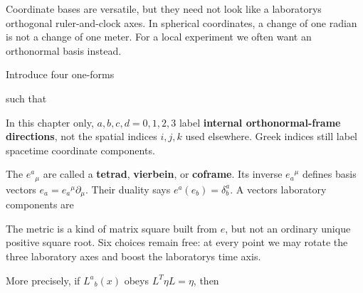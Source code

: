 \documentclass[
  11pt,
  letterpaper,
  oneside,
  openany]{scrbook}
\begin{document}
Coordinate bases are versatile, but they need not look like a
laboratory\textquotesingle s orthogonal ruler-and-clock axes. In
spherical coordinates, a change of one radian is not a change of one
meter. For a local experiment we often want an orthonormal basis
instead.

Introduce four one-forms

\begin{center}
\begingroup
{}
\ifdim\wd\grmathbox>\linewidth
\resizebox{\linewidth}{!}{\usebox{\grmathbox}}
\else\usebox{\grmathbox}\fi
\endgroup
\end{center}

such that

\begin{center}
\begingroup
{}
\ifdim\wd\grmathbox>\linewidth
\resizebox{\linewidth}{!}{\usebox{\grmathbox}}
\else\usebox{\grmathbox}\fi
\endgroup
\end{center}

In this chapter only, \(a,b,c,d=0,1,2,3\) label \textbf{internal
orthonormal-frame directions}, not the spatial indices \(i,j,k\) used
elsewhere. Greek indices still label spacetime coordinate components.

The \(e^a{}_\mu\) are called a \textbf{tetrad}, \textbf{vierbein}, or
\textbf{coframe}. Its inverse \(e_a{}^\mu\) defines basis vectors
\(e_a=e_a{}^\mu\partial_\mu\). Their duality says
\(e^a(e_b)=\delta^a_b\). A vector\textquotesingle s laboratory
components are

\begin{center}
\begingroup
{}
\ifdim\wd\grmathbox>\linewidth
\resizebox{\linewidth}{!}{\usebox{\grmathbox}}
\else\usebox{\grmathbox}\fi
\endgroup
\end{center}

The metric is a kind of matrix square built from \(e\), but not an
ordinary unique positive square root. Six choices remain free: at every
point we may rotate the three laboratory axes and boost the
laboratory\textquotesingle s time axis.

More precisely, if \(L^a{}_b(x)\) obeys \(L^T\eta L=\eta\), then
\end{document}
